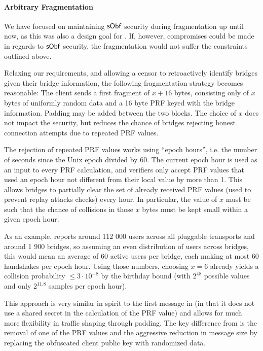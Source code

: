 \paragraph{Arbitrary Fragmentation}
We have focused on maintaining $\mathsf{sObf}$ security during fragmentation up until now, as this was also a design goal for \drivel{}.
If, however, compromises could be made in regards to $\mathsf{sObf}$ security, the fragmentation would not suffer the constraints outlined above.

Relaxing our requirements, and allowing a censor to retroactively identify bridges given their bridge information, the following fragmentation strategy becomes reasonable: The client sends a first fragment of $x+16$ bytes, consisting only of $x$ bytes of uniformly random data and a 16 byte PRF keyed with the bridge information. Padding may be added between the two blocks. The choice of $x$ does not impact the security, but reduces the chance of bridges rejecting honest connection attempts due to repeated PRF values.

The rejection of repeated PRF values works using ``epoch hours'', i.e. the number of seconds since the Unix epoch divided by 60.
The current epoch hour is used as an input to every PRF calculation, and verifiers only accept PRF values that used an epoch hour not different from their local value by more than 1.
This allows bridges to partially clear the set of already received PRF values (used to prevent replay attacks checks) every hour.
In particular, the value of $x$ must be such that the chance of collisions in those $x$ bytes must be kept small within a given epoch hour.

As an example, \cite{tor-metrics} reports around 112 000 users across all pluggable transports and around 1 900 bridges, so assuming an even distribution of users across bridges, this would mean an average of 60 active users per bridge, each making at most 60 handshakes per epoch hour. Using those numbers, choosing $x=6$ already yields a collision probability $\leq 3 \cdot 10^{-8}$ by the birthday bound (with $2^{48}$ possible values and only $2^{11.8}$ samples per epoch hour).

This approach is very similar in spirit to the first message in \obfsfour{} (in that it does not use a shared secret in the calculation of the PRF value) and allows for much more flexibility in traffic shaping through padding. The key difference from \obfsfour{} is the removal of one of the PRF values and the aggressive reduction in message size by replacing the obfuscated client public key with randomized data.

